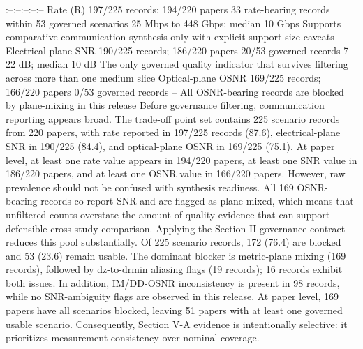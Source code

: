 {}\markdownRendererPipe{}:--\markdownRendererPipe{}:--\markdownRendererPipe{}:--\markdownRendererPipe{}:--\markdownRendererPipe{}:--\markdownRendererPipe{}\markdownRendererSoftLineBreak
{}\markdownRendererPipe{} Rate (\markdownRendererDollarSign{}R\markdownRendererDollarSign{}) \markdownRendererPipe{} 197/225 records; 194/220 papers \markdownRendererPipe{} 33 rate-bearing records within 53 governed scenarios \markdownRendererPipe{} 25 Mbps to 448 Gbps; median 10 Gbps \markdownRendererPipe{} Supports comparative communication synthesis only with explicit support-size caveats \markdownRendererPipe{}\markdownRendererSoftLineBreak
{}\markdownRendererPipe{} Electrical-plane SNR \markdownRendererPipe{} 190/225 records; 186/220 papers \markdownRendererPipe{} 20/53 governed records \markdownRendererPipe{} 7-22 dB; median 10 dB \markdownRendererPipe{} The only governed quality indicator that survives filtering across more than one medium slice \markdownRendererPipe{}\markdownRendererSoftLineBreak
{}\markdownRendererPipe{} Optical-plane OSNR \markdownRendererPipe{} 169/225 records; 166/220 papers \markdownRendererPipe{} 0/53 governed records \markdownRendererPipe{} -- \markdownRendererPipe{} All OSNR-bearing records are blocked by plane-mixing in this release \markdownRendererPipe{}\markdownRendererParagraphSeparator
{}Before governance filtering, communication reporting appears broad. The trade-off point set contains 225 scenario records from 220 papers, with rate reported in 197/225 records (87.6\markdownRendererPercentSign{}), electrical-plane SNR in 190/225 (84.4\markdownRendererPercentSign{}), and optical-plane OSNR in 169/225 (75.1\markdownRendererPercentSign{}). At paper level, at least one rate value appears in 194/220 papers, at least one SNR value in 186/220 papers, and at least one OSNR value in 166/220 papers. However, raw prevalence should not be confused with synthesis readiness. All 169 OSNR-bearing records co-report SNR and are flagged as plane-mixed, which means that unfiltered counts overstate the amount of quality evidence that can support defensible cross-study comparison.\markdownRendererParagraphSeparator
{}Applying the Section II governance contract reduces this pool substantially. Of 225 scenario records, 172 (76.4\markdownRendererPercentSign{}) are blocked and 53 (23.6\markdownRendererPercentSign{}) remain usable. The dominant blocker is metric-plane mixing (169 records), followed by dz-to-drmin aliasing flags (19 records); 16 records exhibit both issues. In addition, IM/DD-OSNR inconsistency is present in 98 records, while no SNR-ambiguity flags are observed in this release. At paper level, 169 papers have all scenarios blocked, leaving 51 papers with at least one governed usable scenario. Consequently, Section V-A evidence is intentionally selective: it prioritizes measurement consistency over nominal coverage.\markdownRendererParagraphSeparator
